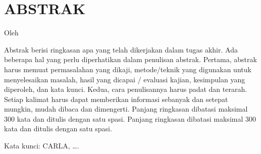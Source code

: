 \chapter*{ABSTRAK}

\begin{center}
	\center
	\begin{doublespace}
		\Large \bfseries \MakeUppercase{\thetitle}

		\normalfont \normalsize
		Oleh

		\theauthor
	\end{doublespace}
\end{center}

\begin{singlespace}
	Abstrak berisi ringkasan apa yang telah dikerjakan dalam tugas akhir. Ada
	beberapa hal yang perlu diperhatikan dalam penulisan abstrak. Pertama,
	abstrak harus memuat permasalahan yang dikaji, metode/teknik yang digunakan
	untuk menyelesaikan masalah, hasil yang dicapai / evaluasi kajian,
	kesimpulan yang diperoleh, dan kata kunci. Kedua, cara penulisannya harus
	padat dan terarah. Setiap kalimat harus dapat memberikan informasi sebanyak
	dan setepat mungkin, mudah dibaca dan dimengerti. Panjang ringkasan dibatasi
	maksimal 300 kata dan ditulis dengan satu spasi. Panjang ringkasan dibatasi
	maksimal 300 kata dan ditulis dengan satu spasi.

	Kata kunci: CARLA, \dots .
\end{singlespace}

\clearpage
